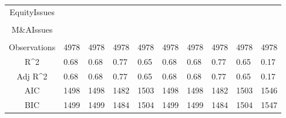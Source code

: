 \documentclass{article}
\begin{document}
\begin{table}[H]
\begin{tabular}{|clllllllll|}
  EquityIssues &  &  &  &  &  &  &  &  &  \\ 
   &  &  &  &  &  &  &  &  &  \\ 
  M\&AIssues &  &  &  &  &  &  &  &  &  \\ 
   &  &  &  &  &  &  &  &  &  \\ 
  \hline 
 Observations & 4978 & 4978 & 4978 & 4978 & 4978 & 4978 & 4978 & 4978 & 4978 \\ 
  R^2 & 0.68 & 0.68 & 0.77 & 0.65 & 0.68 & 0.68 & 0.77 & 0.65 & 0.17 \\ 
  Adj R^2 & 0.68 & 0.68 & 0.77 & 0.65 & 0.68 & 0.68 & 0.77 & 0.65 & 0.17 \\ 
  AIC & 1498 & 1498 & 1482 & 1503 & 1498 & 1498 & 1482 & 1503 & 1546 \\ 
  BIC & 1499 & 1499 & 1484 & 1504 & 1499 & 1499 & 1484 & 1504 & 1547 \\ 
   \hline
\end{tabular}
 
\end{table}
\end{document}
